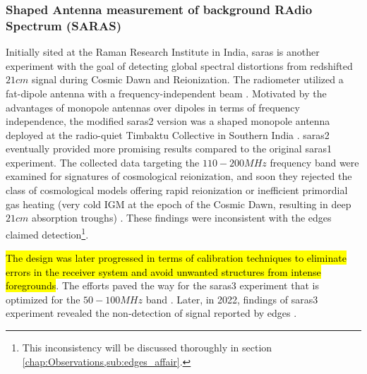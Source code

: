 \documentclass[12pt, TexShade, letterpaper]{report}
\begin{document}
\subsubsection{Shaped Antenna measurement of background RAdio Spectrum (SARAS)} 
Initially sited at the Raman Research Institute in India, \gls{saras} is another experiment with the goal of detecting global spectral distortions from redshifted $21cm$ signal during Cosmic Dawn and Reionization. The radiometer utilized a fat-dipole antenna with a frequency-independent beam \cite{saras_1}. Motivated by the advantages of monopole antennas over dipoles in terms of frequency independence, the modified \gls{saras}2 version was a shaped monopole antenna deployed at the radio-quiet Timbaktu Collective in Southern India \cite{saras_2}. \gls{saras}2 eventually provided more promising results compared to the original \gls{saras}1 experiment. The collected data targeting the $110-200 MHz$ frequency band were examined for signatures of cosmological reionization, and soon they rejected the class of cosmological models offering rapid reionization or inefficient primordial gas heating (very cold IGM at the epoch of the Cosmic Dawn, resulting in deep $21cm$ absorption troughs) \cite{saras_2_constrains, saras_2_results}. These findings were inconsistent with the \gls{edges} claimed detection\footnote{This inconsistency will be discussed thoroughly in section \ref{chap:Observations,sub:edges_affair}.}\cite{dark_ages_space, thesis_shedding, saras_curse_edges}.\par
\hl{The design was later progressed in terms of calibration techniques to eliminate errors in the receiver system and avoid unwanted structures from intense foregrounds}. The efforts paved the way for the \gls{saras}3 experiment that is optimized for the $50-100 MHz$ band \cite{saras_3, dark_ages_space}. Later, in 2022, findings of \gls{saras}3 experiment revealed the non-detection of signal reported by \gls{edges} \cite{saras_3_results}.\par
\end{document}
